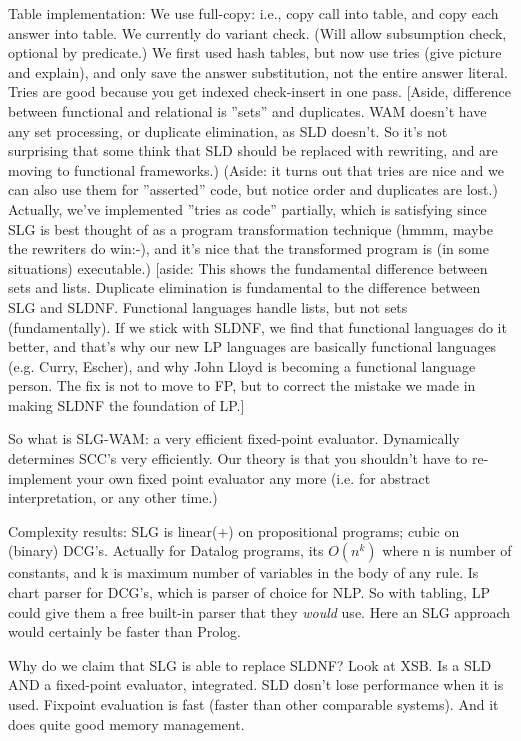 Table implementation: We use full-copy: i.e., copy call into table,
and copy each answer into table.  We currently do variant check.
(Will allow subsumption check, optional by predicate.)  We first used
hash tables, but now use tries (give picture and explain), and only
save the answer substitution, not the entire answer literal.  Tries
are good because you get indexed check-insert in one pass.  [Aside,
difference between functional and relational is ''sets'' and
duplicates.  WAM doesn't have any set processing, or duplicate
elimination, as SLD doesn't.  So it's not surprising that some think
that SLD should be replaced with rewriting, and are moving to
functional frameworks.) (Aside: it turns out that tries are nice and
we can also use them for ''asserted'' code, but notice order and
duplicates are lost.)  Actually, we've implemented ''tries as code''
partially, which is satisfying since SLG is best thought of as a
program transformation technique (hmmm, maybe the rewriters do win:-),
and it's nice that the transformed program is (in some situations)
executable.)
[aside: This shows the fundamental difference between sets and lists.
Duplicate elimination is fundamental to the difference between SLG and
SLDNF.  Functional languages handle lists, but not sets
(fundamentally).  If we stick with SLDNF, we find that functional
languages do it better, and that's why our new LP languages are
basically functional languages (e.g. Curry, Escher), and why John
Lloyd is becoming a functional language person.  The fix is not to
move to FP, but to correct the mistake we made in making SLDNF the
foundation of LP.]

So what is SLG-WAM: a very efficient fixed-point evaluator.
Dynamically determines SCC's very efficiently.  Our theory is that you
shouldn't have to re-implement your own fixed point evaluator any more
(i.e. for abstract interpretation, or any other time.)

Complexity results: SLG is linear(+) on propositional programs; cubic
on (binary) DCG's.  Actually for Datalog programs, its $O(n^k)$ where n
is number of constants, and k is maximum number of variables in the
body of any rule.  Is chart parser for DCG's, which is parser of
choice for NLP.  So with tabling, LP could give them a free built-in
parser that they {\em would} use.  Here an SLG approach would
certainly be faster than Prolog.

Why do we claim that SLG is able to replace SLDNF?  Look at XSB.  Is a
SLD AND a fixed-point evaluator, integrated.  SLD dosn't lose
performance when it is used.  Fixpoint evaluation is fast (faster than
other comparable systems).  And it does quite good memory management.

